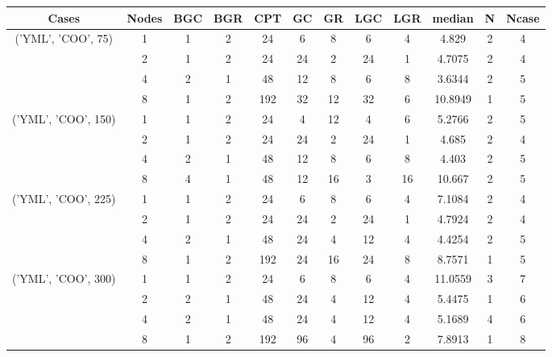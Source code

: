 \begin{tabular}{cccccccccccc}
\hline
Cases & Nodes& BGC& BGR& CPT& GC& GR& LGC& LGR& median & N & Ncase \\
\hline
\multirow{4}{*}{('YML', 'COO', 75)}& 1& 1& 2& 24& 6& 8& 6& 4& 4.829& 2& 4\\
& 2& 1& 2& 24& 24& 2& 24& 1& 4.7075& 2& 4\\
& 4& 2& 1& 48& 12& 8& 6& 8& 3.6344& 2& 5\\
& 8& 1& 2& 192& 32& 12& 32& 6& 10.8949& 1& 5\\
\hline
\multirow{4}{*}{('YML', 'COO', 150)}& 1& 1& 2& 24& 4& 12& 4& 6& 5.2766& 2& 5\\
& 2& 1& 2& 24& 24& 2& 24& 1& 4.685& 2& 4\\
& 4& 2& 1& 48& 12& 8& 6& 8& 4.403& 2& 5\\
& 8& 4& 1& 48& 12& 16& 3& 16& 10.667& 2& 5\\
\hline
\multirow{4}{*}{('YML', 'COO', 225)}& 1& 1& 2& 24& 6& 8& 6& 4& 7.1084& 2& 4\\
& 2& 1& 2& 24& 24& 2& 24& 1& 4.7924& 2& 4\\
& 4& 2& 1& 48& 24& 4& 12& 4& 4.4254& 2& 5\\
& 8& 1& 2& 192& 24& 16& 24& 8& 8.7571& 1& 5\\
\hline
\multirow{4}{*}{('YML', 'COO', 300)}& 1& 1& 2& 24& 6& 8& 6& 4& 11.0559& 3& 7\\
& 2& 2& 1& 48& 24& 4& 12& 4& 5.4475& 1& 6\\
& 4& 2& 1& 48& 24& 4& 12& 4& 5.1689& 4& 6\\
& 8& 1& 2& 192& 96& 4& 96& 2& 7.8913& 1& 8\\
\hline
\end{tabular}
